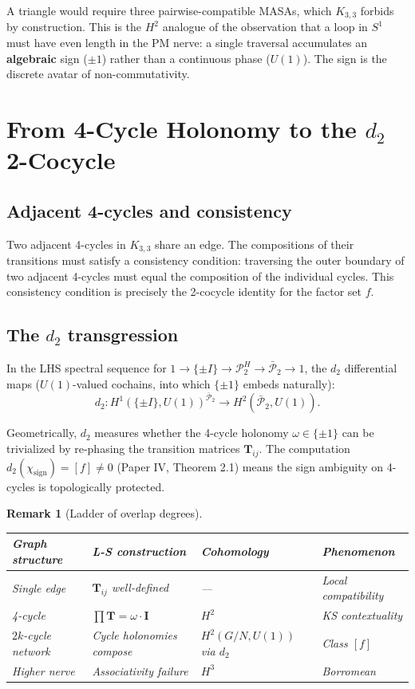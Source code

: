 \documentclass[11pt]{article}
\newtheorem{remark}[theorem]{Remark}
\begin{document}
A triangle would require three pairwise-compatible MASAs, which $K_{3,3}$ forbids
by construction. This is the $H^2$ analogue of the observation that a loop in
$S^1$ must have even length in the PM nerve: a single traversal accumulates an
\textbf{algebraic} sign ($\pm 1$) rather than a continuous phase ($U(1)$).
The sign is the discrete avatar of non-commutativity.

\section{From 4-Cycle Holonomy to the $d_2$ 2-Cocycle}
\label{sec:d2}

\subsection{Adjacent 4-cycles and consistency}
\label{sec:adjacent}

Two adjacent 4-cycles in $K_{3,3}$ share an edge. The compositions of their
transitions must satisfy a consistency condition: traversing the outer boundary
of two adjacent 4-cycles must equal the composition of the individual cycles.
This consistency condition is precisely the 2-cocycle identity for the
factor set $f$.

\subsection{The $d_2$ transgression}
\label{sec:d2-transgression}

In the LHS spectral sequence for
$1 \to \{\pm I\} \to \mathcal{P}_2^H \to \bar{\mathcal{P}}_2 \to 1$, the
$d_2$ differential maps ($U(1)$-valued cochains, into which $\{\pm 1\}$
embeds naturally):
\[
d_2: H^1(\{\pm I\}, U(1))^{\bar{\mathcal{P}}_2} \to H^2(\bar{\mathcal{P}}_2, U(1)).
\]

Geometrically, $d_2$ measures whether the 4-cycle holonomy $\omega \in \{\pm 1\}$
can be trivialized by re-phasing the transition matrices $\mathbf{T}_{ij}$.
The computation $d_2(\chi_{\text{sign}}) = [f] \neq 0$ (Paper IV, Theorem 2.1)
means the sign ambiguity on 4-cycles is topologically protected.

\begin{remark}[Ladder of overlap degrees]
\begin{center}
\begin{tabular}{llll}
\toprule
Graph structure & L-S construction & Cohomology & Phenomenon \\
\midrule
Single edge & $\mathbf{T}_{ij}$ well-defined & --- & Local compatibility \\
4-cycle & $\prod \mathbf{T} = \omega \cdot \mathbf{I}$ & $H^2$ & KS contextuality \\
$2k$-cycle network & Cycle holonomies compose & $H^2(G/N, U(1))$ via $d_2$ & Class $[f]$ \\
Higher nerve & Associativity failure & $H^3$ & Borromean \\
\bottomrule
\end{tabular}
\end{center}
\end{remark}
\end{document}

